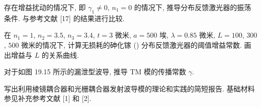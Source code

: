 \documentclass{note}
\begin{document}
\begin{exe}
    存在增益扰动的情况下, 即 $\gamma_1\neq 0$, $n_1=0$ 的情况下, 推导分布反馈激光器的振荡条件. 与参考文献 [17] 的结果进行比较.
\end{exe}
\begin{sol}
    
\end{sol}

\begin{exe}
    在 $n_1=1$, $n_2=3.5$, $n_3=3.4$, $t=3$ 微米, $a=500$ 埃, $\lambda=0.85$ 微米, $L=100$, $300$, $500$ 微米的情况下, 计算无损耗的砷化镓 () 分布反馈激光器的阈值增益常数. 画出增益与 $L$ 的关系曲线.
\end{exe}
\begin{sol}
    
\end{sol}

\begin{exe}
    对于如图 19.15 所示的漏泄型波导, 推导 TM 模的传播常数 $\gamma$.
\end{exe}
\begin{sol}
\end{sol}

\begin{exe}
    写出利用棱镜耦合器和光栅耦合器发射波导模的理论和实践的简短报告. 基础材料参见补充参考文献 [1] 和 [2].
\end{exe}
\begin{sol}
\end{sol}
\end{document}
